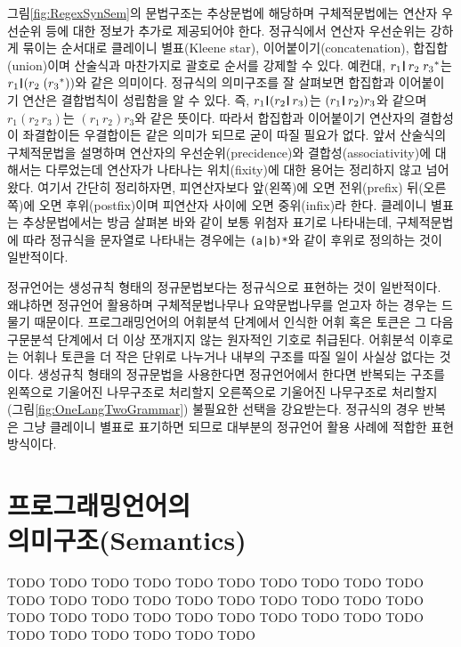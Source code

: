 \documentclass[b5paper,chapter,figtabcapt]{oblivoir}
\newcommand{\VERT}{\ensuremath{\mathop{\!\!\resizebox{1.65ex}{.7em}{\texttt{|}}\!}}}
\begin{document}
그림\;\ref{fig:RegexSynSem}의 문법구조는 추상문법에 해당하며
구체적문법에는 연산자 우선순위 등에 대한 정보가 추가로 제공되어야 한다.
정규식에서 연산자 우선순위는 강하게 묶이는 순서대로
클레이니 별표(Kleene star), 이어붙이기(concatenation), 합집합(union)이며
산술식과 마찬가지로 괄호로 순서를 강제할 수 있다. 예컨대,
$r_1\VERT r_2\;{r_3}^*$는 $r_1\VERT(r_2\;({r_3}^*))$와 같은 의미이다.
정규식의 의미구조를 잘 살펴보면 합집합과 이어붙이기 연산은 결합법칙이
성립함을 알 수 있다. 즉, $r_1\VERT(r_2\VERT r_3)$는 $(r_1\VERT r_2)r_3$와
같으며 $r_1(r_2\,r_3)$는 $(r_1\,r_2)r_3$와 같은 뜻이다. 따라서 합집합과
이어붙이기 연산자의 결합성이 좌결합이든 우결합이든 같은 의미가 되므로
굳이 따질 필요가 없다. 앞서 산술식의 구체적문법을 설명하며 연산자의
우선순위(precidence)와 결합성(associativity)에 대해서는 다루었는데
연산자가 나타나는 위치(fixity)에 대한 용어는 정리하지 않고 넘어왔다.
여기서 간단히 정리하자면, 피연산자보다 앞(왼쪽)에 오면 전위(prefix)
뒤(오른쪽)에 오면 후위(postfix)이며 피연산자 사이에 오면 중위(infix)라 한다.
클레이니 별표는 추상문법에서는 방금 살펴본 바와 같이 보통 위첨자 표기로
나타내는데, 구체적문법에 따라 정규식을 문자열로 나타내는 경우에는
\verb/(a|b)*/와 같이 후위로 정의하는 것이 일반적이다.

정규언어는 생성규칙 형태의 정규문법보다는 정규식으로 표현하는
것이 일반적이다. 왜냐하면 정규언어 활용하며 구체적문법나무나 요약문법나무를
얻고자 하는 경우는 드물기 때문이다. 프로그래밍언어의 어휘분석 단계에서
인식한 어휘 혹은 토큰은 그 다음 구문분석 단계에서 더 이상 쪼개지지 않는
원자적인 기호로 취급된다. 어휘분석 이후로는 어휘나 토큰을 더 작은 단위로
나누거나 내부의 구조를 따질 일이 사실상 없다는 것이다. 생성규칙 형태의
정규문법을 사용한다면 정규언어에서 한다면 반복되는 구조를 왼쪽으로 기울어진
나무구조로 처리할지 오른쪽으로 기울어진 나무구조로 처리할지
(그림\;\ref{fig:OneLangTwoGrammar}) 불필요한 선택을 강요받는다.
정규식의 경우 반복은 그냥 클레이니 별표로 표기하면 되므로 대부분의
정규언어 활용 사례에 적합한 표현 방식이다.

\chapter[프로그래밍언어의 의미구조(Semantics)]{프로그래밍언어의\\의미구조(Semantics)}

TODO TODO TODO TODO TODO TODO TODO TODO TODO TODO TODO TODO
TODO TODO TODO TODO TODO TODO TODO TODO TODO TODO TODO TODO
TODO TODO TODO TODO TODO TODO TODO TODO TODO TODO TODO TODO

\newpage
\end{document}
